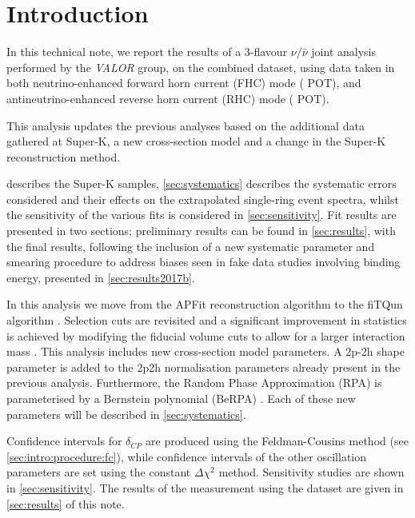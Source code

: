 
\section {Introduction}
\label{sec:intro}

In this technical note, we report the results of a 3-flavour $\nu/\bar{\nu}$ joint analysis performed by the {\em VALOR} group, on the combined \RunPeriod dataset, using data taken in both neutrino-enhanced forward horn current (FHC) mode (\TotalPotNuRunOneEight{} POT), and antineutrino-enhanced reverse horn current (RHC) mode (\TotalPotNuBarRunOneEight{} POT).

This analysis updates the previous analyses based on the additional data gathered at Super-K, a new cross-section model and a change in the Super-K reconstruction method.

 describes the Super-K samples, \cref{sec:systematics} describes the systematic errors considered and their effects on the extrapolated single-ring event spectra, whilst the sensitivity of the various fits is considered in \cref{sec:sensitivity}. \color{blue}Fit results are presented in two sections; preliminary results can be found in \cref{sec:results}, with the final results, following the inclusion of a new systematic parameter and smearing procedure to address biases seen in fake data studies involving binding energy, presented in \cref{sec:results2017b}\color{black}.

In this analysis we move from the APFit reconstruction algorithm to the fiTQun algorithm \cite{fiTQunAlgo}. Selection cuts are revisited and a significant improvement in statistics is achieved by modifying the fiducial volume cuts to allow for a larger interaction mass \cite{fiTQunEvSelOpt}. This analysis includes new cross-section model parameters. A 2p-2h shape parameter is added to the 2p2h normalisation parameters already present in the previous analysis. Furthermore, the Random Phase Approximation (RPA) is parameterised by a Bernstein polynomial (BeRPA) \cite{NIWGUpdate2017}. Each of these new parameters will be described in \cref{sec:systematics}.

Confidence intervals for $\delta_{CP}$ are produced using the Feldman-Cousins method (see \cref{sec:intro:procedure:fc}), while confidence intervals of the other oscillation parameters are set using the constant $\Delta \chi^2$ method. Sensitivity studies are shown in \cref{sec:sensitivity}. The results of the measurement using the \RunPeriod dataset are given in \cref{sec:results} of this note. 

